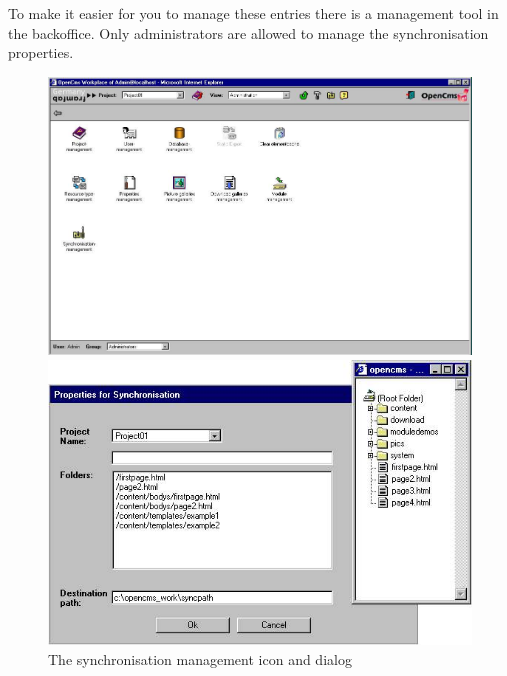 To make it easier for you to manage these entries there is a
management tool in the backoffice. Only administrators are allowed
to manage the synchronisation properties.

\begin{figure}[hbt]

\begin{minipage}[b]{0.499\linewidth}
  \begin{center}
  \includegraphics[clip,width=\sgw]
                   {pics/synchronize/syncprop01}
 \end{center}
\end{minipage}
\hfill
\begin{minipage}[b]{0.499\linewidth}
   \begin{center}
   \includegraphics[clip,width=\sgw]
                   {pics/synchronize/syncprop02}
   \end{center}
\end{minipage}
\caption[The synchronisation management icon and dialog]
           {The synchronisation management icon and dialog}
 \label{syncproperties}

\end{figure}

